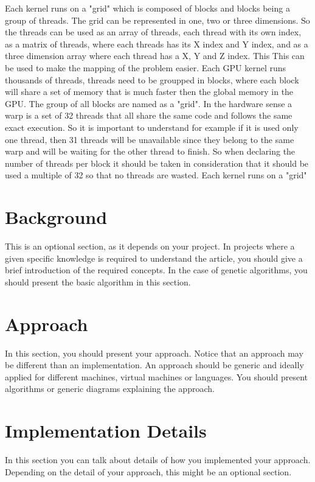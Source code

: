 \documentclass[runningheads]{llncs}
\begin{document}
Each kernel runs on a "grid" which is composed of blocks and blocks being a group of threads. The grid can be represented in one, two or three dimensions. So the threads can be used as an array of threads, each thread with its own index, as a matrix of threads, where each threads has its X index and Y index, and as a three dimension array where each thread has a X, Y and Z index. This  This can be used to make the mapping of the problem easier.
Each GPU kernel runs thousands of threads, threads need to be groupped in blocks, where each block will share a set of memory that is much faster then the global memory in the GPU. The group of all blocks are named as a "grid".
In the hardware sense a warp is a set of 32 threads that all share the same code and follows the same exact execution. So it is important to understand for example if it is used only one thread, then 31 threads will be unavailable  since they belong to the same warp and will be waiting for the other thread to finish. So when declaring the number of threads per block it should be taken in consideration that it should be used a multiple of 32 so that no threads are wasted.
Each kernel runs on a "grid"

\section{Background}

This is an optional section, as it depends on your project. In projects where a given specific knowledge is required to understand the article, you should give a brief introduction of the required concepts. In the case of genetic algorithms, you should present the basic algorithm in this section.


\section{Approach}

In this section, you should present your approach. Notice that an approach may be different than an implementation. An approach should be generic and ideally applied for different machines, virtual machines or languages. You should present algorithms or generic diagrams explaining the approach.

\section{Implementation Details}

In this section you can talk about details of how you implemented your approach. Depending on the detail of your approach, this might be an optional section.
\end{document}
